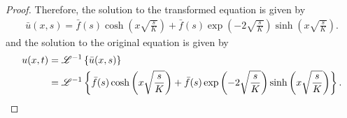 \begin{proof}
  Therefore, the solution to the transformed equation is given by
  \begin{align*}
    \bar{u}(x, s) = \bar{f}(s)\cosh\left(x\sqrt{\frac{s}{K}}\right) + \bar{f}(s) \exp\left(-2\sqrt{\frac{s}{K}}\right)\sinh\left(x\sqrt{\frac{s}{K}}\right).
  \end{align*}
  and the solution to the original equation is given by
  \begin{align*}
    u(x, t) &= \mathscr{L}^{-1}\left\{ {\bar{u}(x, s)} \right\} \\
    &= \mathscr{L}^{-1}\left\{ {\bar{f}(s)\cosh\left(x\sqrt{\frac{s}{K}}\right) + \bar{f}(s) \exp\left(-2\sqrt{\frac{s}{K}}\right)\sinh\left(x\sqrt{\frac{s}{K}}\right)} \right\}.
  \end{align*}
\end{proof}
\newpage

